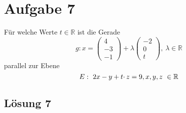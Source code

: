\documentclass[main.tex]{subfiles}
\begin{document}
\section{Aufgabe 7}

Für welche Werte $t\in \mathbb{R}$ ist die Gerade
\begin{equation*}
    g:x=\begin{pmatrix}
    4\\
    -3\\
    -1
    \end{pmatrix} +\lambda \begin{pmatrix}
    -2\\
    0\\
    t
    \end{pmatrix} ,\ \lambda \in \mathbb{R}
\end{equation*}
parallel zur Ebene
\begin{equation*}
    E:\ 2x-y+t\cdotp z=9,\kern+0.01em x,y,z\ \in \mathbb{R}
\end{equation*}

\subsection{Lösung 7}
\end{document}
